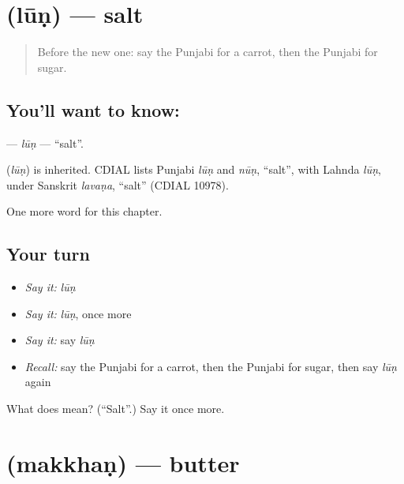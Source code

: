 \section[\texorpdfstring{\pa{ਲੂਣ} (lūṇ)}{ਲੂਣ (lūṇ)}]{ (lūṇ) — salt}

\label{lesson:PA-C65-lun}



\begin{quote}
Before the new one: say the Punjabi for a carrot, then the Punjabi for sugar.
\end{quote}

\subsection*{You'll want to know: }
\textbf{} — \emph{lūṇ} — \textquotedblleft{}salt\textquotedblright{}.

\begin{cousinweb}
\textbf{} (\emph{lūṇ}) is inherited. CDIAL lists Punjabi \emph{lūṇ} and \emph{nūṇ}, \textquotedblleft{}salt\textquotedblright{}, with Lahnda \emph{lūṇ}, under Sanskrit \emph{lavaṇa}, \textquotedblleft{}salt\textquotedblright{} (CDIAL 10978).
\end{cousinweb}

\begin{grammarlens}[title={What you've built}]
One more word for this chapter.
\end{grammarlens}

\subsection*{Your turn}
\begin{itemize}
\raggedright
  \item \emph{Say it:} \emph{lūṇ}
  \item \emph{Say it:} \emph{lūṇ}, once more
  \item \emph{Say it:} say \emph{lūṇ}
  \item \emph{Recall:} say the Punjabi for a carrot, then the Punjabi for sugar, then say \emph{lūṇ} again
\end{itemize}

\begin{tcolorbox}[breakable,colback=teal!4,colframe=teal!35!black,title={Before you move on}]
What does  mean? (\textquotedblleft{}Salt\textquotedblright{}.) Say it once more.
\end{tcolorbox}
\section[\texorpdfstring{\pa{ਮੱਖਣ} (makkhaṇ)}{ਮੱਖਣ (makkhaṇ)}]{ (makkhaṇ) — butter}

